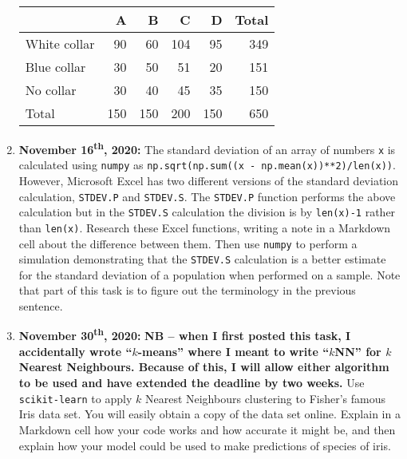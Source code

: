 \documentclass[a4paper, 12pt]{scrartcl}
\begin{document}
\begin{enumerate}
        \begin{table}[H]
          \setlength{\tabcolsep}{12pt}
          \renewcommand{\arraystretch}{1.1}
          \centering
          \begin{tabular}{lrrrrr}
            & A & B & C& D & Total \\
            \midrule
            White collar & 90 & 60 & 104 & 95 & 349 \\
            Blue collar & 30 & 50 & 51 & 20 & 151 \\
            No collar & 30 & 40 & 45 & 35 & 150 \\
            \midrule
            Total & 150 & 150 & 200 & 150 & 650
          \end{tabular}
        \end{table}
        \newpage
      \item
        \textbf{November 16\textsuperscript{th}, 2020:}
        The standard deviation of an array of numbers \texttt{x} is calculated using \texttt{numpy} as \texttt{np.sqrt(np.sum((x - np.mean(x))**2)/len(x))}.
        However, Microsoft Excel has two different versions of the standard deviation calculation, \texttt{STDEV.P} and \texttt{STDEV.S}.
        The \texttt{STDEV.P} function performs the above calculation but in the \texttt{STDEV.S} calculation the division is by \texttt{len(x)-1} rather than \texttt{len(x)}.
        Research these Excel functions, writing a note in a Markdown cell about the difference between them.
        Then use \texttt{numpy} to perform a simulation demonstrating that the \texttt{STDEV.S} calculation is a better estimate for the standard deviation of a population when performed on a sample.
        Note that part of this task is to figure out the terminology in the previous sentence.
      \item
        \textbf{November 30\textsuperscript{th}, 2020:}
        \textbf{NB -- when I first posted this task, I accidentally wrote ``$k$-means'' where I meant to write ``$k$NN'' for $k$ Nearest Neighbours.
        Because of this, I will allow either algorithm to be used and have extended the deadline by two weeks.}
        Use \texttt{scikit-learn} to apply $k$ Nearest Neighbours clustering to Fisher's famous Iris data set.
        You will easily obtain a copy of the data set online.
        Explain in a Markdown cell how your code works and how accurate it might be, and then explain how your model could be used to make predictions of species of iris.
    \end{enumerate}
\end{document}
